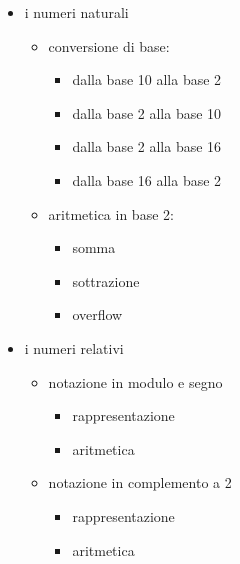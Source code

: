 \begin{itemize}
  \item  i numeri naturali
  \begin{itemize}
     \item conversione di base: 
     \begin{itemize}
    	\item dalla base 10 alla base 2
    	\item dalla base 2 alla base 10
    	\item dalla base 2 alla base 16
    	\item dalla base 16 alla base 2
    \end{itemize}
    \item aritmetica in base 2: 
    \begin{itemize}
    	\item somma
    	\item sottrazione
	   \item overflow
    \end{itemize}
  \end{itemize}
\item  i numeri relativi 
  \begin{itemize}
     \item notazione in modulo e segno
     \begin{itemize}
    		\item rappresentazione
    		\item aritmetica
	  \end{itemize}	
     \item notazione in complemento a 2
     \begin{itemize}
    		\item rappresentazione
    		\item aritmetica
	  \end{itemize}	
  \end{itemize}
\end{itemize}
\mysep{}

